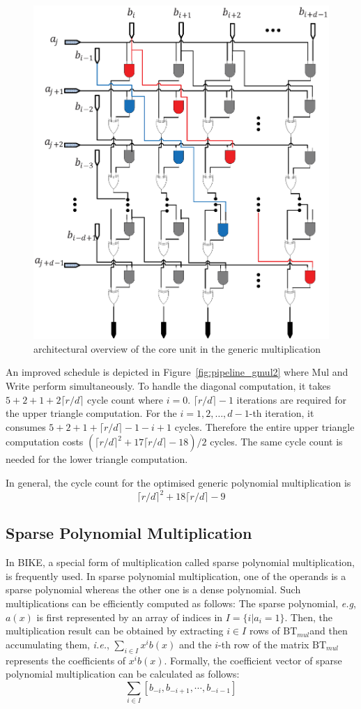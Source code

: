 \documentclass[runningheads]{llncs}
\begin{document}
\begin{figure}[!tb]
\centering
\includegraphics[width=.55\textwidth]{./fig/dsnmul_core.eps}
\caption{architectural overview of the core unit in the generic multiplication}\label{fig:gmul_core}
\end{figure}

An improved schedule is depicted in Figure~\ref{fig:pipeline_gmul2} 
where Mul and Write perform simultaneously.
To handle the diagonal computation, 
it takes $5+2+1+2\lceil r/d\rceil$ cycle count where $i=0$. $\lceil r/d\rceil -1$ iterations are required for the upper triangle computation. 
For the $i=1,2,\ldots,d-1$-th iteration, it 
consumes $5+2+1+\lceil r/d\rceil -1-i+1$ cycles.
Therefore the entire upper triangle computation costs $(\lceil r/d\rceil^2 +17\lceil r/d\rceil-18)/2$ cycles. 
The same cycle count is needed for the lower triangle computation.

In general, the cycle count for the optimised generic polynomial multiplication is
\[
    \lceil r/d\rceil^2 + 18\lceil r/d\rceil - 9
\]



\subsection{Sparse Polynomial Multiplication}
\label{sub::sparse}
In BIKE, a special form of multiplication called sparse polynomial multiplication, 
is frequently used. In sparse polynomial multiplication, one of the operands 
is a sparse polynomial whereas the other one is a dense polynomial. 
Such multiplications can be efficiently computed as follows: 
The sparse polynomial, \textit{e.g}, $a(x)$ is first represented 
by an array of indices in $I=\{i|a_i=1\}$. 
Then, the multiplication result can be obtained by extracting $i\in I$ rows of $\text{BT}_{mul}$and then accumulating them, \textit{i.e.}, $\sum_{i\in I} x^ib(x)$ and the $i$-th row of the matrix $\text{BT}_{mul}$ represents the coefficients of $x^ib(x)$. Formally, the coefficient vector of sparse polynomial multiplication can be calculated as follows:
\[
    \sum_{i\in I} [b_{-i},b_{-i+1},\cdots,b_{-i-1}]
\]
\end{document}
